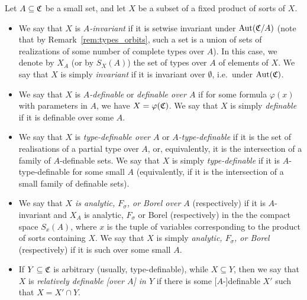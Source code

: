 	\begin{dfn}
		Let $A\subseteq {\mathfrak C}$ be a small set, and let $X$ be a subset of a fixed product of sorts of $X$.
		\begin{itemize}
			\item
			We say that $X$ is {\em $A$-invariant} if it is setwise invariant under $\operatorname{{Aut}}({\mathfrak C}/A)$ (note that by Remark~\ref{rem:types_orbits}, such a set is a union of sets of realizations of some number of complete types over $A$). In this case, we denote by $X_A$ (or by $S_X(A)$) the set of types over $A$ of elements of $X$. We say that $X$ is simply \emph{invariant} if it is invariant over $\emptyset$, i.e.\ under $\operatorname{{Aut}}({\mathfrak C})$.
			\item
			We say that $X$ is \emph{$A$-definable} or \emph{definable over $A$} if for some formula $\varphi(x)$ with parameters in $A$, we have $X=\varphi({\mathfrak C})$. We say that $X$ is simply \emph{definable} if it is definable over some $A$.
			\item
			We say that $X$ is \emph{type-definable over $A$} or \emph{$A$-type-definable} if it is the set of realisations of a partial type over $A$, or, equivalently, it is the intersection of a family of $A$-definable sets. We say that $X$ is simply \emph{type-definable} if it is $A$-type-definable for some small $A$ (equivalently, if it is the intersection of a small family of definable sets).
			\item
			We say that \emph{$X$ is analytic, $F_\sigma$, or Borel over $A$} (respectively) if it is $A$-invariant and $X_A$ is analytic, $F_\sigma$ or Borel (respectively) in the the compact space $S_x(A)$, where $x$ is the tuple of variables corresponding to the product of sorts containing $X$. We say that $X$ is simply \emph{analytic, $F_\sigma$, or Borel} (respectively) if it is such over some small $A$.
			\item
			If $Y\subseteq {\mathfrak C}$ is arbitrary (usually, type-definable), while $X\subseteq Y$, then we say that $X$ is \emph{relatively definable [over $A$] in $Y$} if there is some [$A$-]definable $X'$ such that $X=X'\cap Y$.
			\xqed{\lozenge}
		\end{itemize}
	\end{dfn}
	
